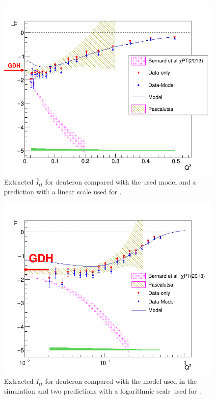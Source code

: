 \begin{figure}[H] %
  \centering
  \leavevmode \includegraphics[width=1.0\textwidth]{figuresEG4/FigResults/integralsFromCombinedG1nA1F1_Wbins70IttLowQ2.png} 
  \caption[$\bar{I}_{tt}$ (linear scale)]{Extracted $\bar{I}_{tt}$ for deuteron compared with the used model and a \chipts prediction  with a linear scale used for \qsq.}
  \label{GDHLow}  
\end{figure}

\begin{figure}[H] %
  \centering
  \leavevmode \includegraphics[width=1.0\textwidth]{figuresEG4/FigResults/integralsFromCombinedG1nA1F1_Wbins70IttLogN.png} 
  \caption[$I^d_{tt}$ (log scale)]{Extracted $I_{tt}$ for deuteron compared with the model used in the simulation and two \chipts predictions  with a logarithmic scale used for \qsq.}
  \label{GDHLog}  
\end{figure}




